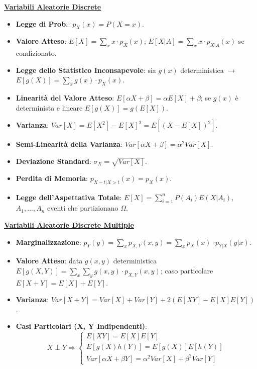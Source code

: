 \documentclass{article}
\begin{document}
\begin{multicols*}{3}
\textbf{\underline{Variabili Aleatorie Discrete}}
\begin{itemize}
    \item \textbf{Legge di Prob.}: $p_{X}(x)=P(X=x)$.
    \item \textbf{Valore Atteso}: $E[X]=\sum_{x}x\cdot p_{X}(x)$; $E[X|A]=\sum_{x}x\cdot p_{X|A}(x)$ se condizionato.
    \item \textbf{Legge dello Statistico Inconsapevole}: sia $g(x)$ deterministica $\rightarrow$ $E[g(X)]=\sum_{x}g(x)\cdot p_{X}(x)$.
    \item \textbf{Linearità del Valore Atteso}: $E[\alpha X+\beta]=\alpha E[X]+\beta$; se $g(x)$ è determinista e lineare $E[g(X)]=g(E[X])$.
    \item \textbf{Varianza}: $Var[X]=E[X^{2}]-E[X]^{2}=E[(X-E[X])^{2}]$.
    \item \textbf{Semi-Linearità della Varianza}: $Var[\alpha X+\beta]=\alpha^{2}Var[X]$.
    \item \textbf{Deviazione Standard}: $\sigma_{X}=\sqrt{Var[X]}$.
    \item \textbf{Perdita di Memoria}: $p_{X-t|X>t}(x)=p_{X}(x)$.
    \item \textbf{Legge dell'Aspettativa Totale}: $E[X]=\sum_{i=1}^{n}P(A_{i})E(X|A_{i})$, $A_{1},...,A_{n}$ eventi che partizionano $\Omega$.
\end{itemize}

\textbf{\underline{Variabili Aleatorie Discrete Multiple}}
\begin{itemize}
    \item \textbf{Marginalizzazione}: $p_{Y}(y)=\sum_{x}p_{X,Y}(x,y)=\sum_{x}p_{X}(x)\cdot p_{Y|X}(y|x)$.
    \item \textbf{Valore Atteso}: data $g(x,y)$ deterministica $E[g(X,Y)]=\sum_{x}\sum_{y}g(x,y)\cdot p_{X,Y}(x,y)$; caso particolare $E[X+Y]=E[X]+E[Y]$.
    \item \textbf{Varianza}: $Var[X+Y]=Var[X]+Var[Y]+2(E[XY]-E[X]E[Y])$.
    \item \textbf{Casi Particolari (X, Y Indipendenti)}:
    \useshortskip \begin{equation*}
        X\perp Y\Rightarrow \begin{cases}E[XY]=E[X]E[Y]\\ E[g(X)h(Y)]=E[g(X)]E[h(Y)]\\Var[\alpha X+\beta Y]=\alpha^{2}Var[X]+\beta^{2}Var[Y]\end{cases}
    \end{equation*}
\end{itemize}


\end{multicols*}
\end{document}
